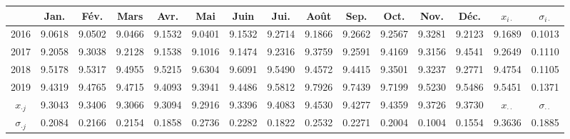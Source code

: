 \begin{tabular}{ccccccccccccccc}
    \toprule
        & Jan. & Fév. & Mars & Avr. & Mai & Juin & Jui. & Août & Sep. & Oct. & Nov. & Déc. & $x_{i\cdot}$ & $\sigma_{i\cdot}$ \\
    \midrule
        2016 & 9.0618 & 9.0502 & 9.0466 & 9.1532 & 9.0401 & 9.1532 & 9.2714 & 9.1866 & 9.2662 & 9.2567 & 9.3281 & 9.2123 & 9.1689 & 0.1013 \\ 
        2017 & 9.2058 & 9.3038 & 9.2128 & 9.1538 & 9.1016 & 9.1474 & 9.2316 & 9.3759 & 9.2591 & 9.4169 & 9.3156 & 9.4541 & 9.2649 & 0.1110 \\ 
        2018 & 9.5178 & 9.5317 & 9.4955 & 9.5215 & 9.6304 & 9.6091 & 9.5490 & 9.4572 & 9.4415 & 9.3501 & 9.3237 & 9.2771 & 9.4754 & 0.1105 \\ 
        2019 & 9.4319 & 9.4765 & 9.4715 & 9.4093 & 9.3941 & 9.4486 & 9.5812 & 9.7926 & 9.7439 & 9.7199 & 9.5230 & 9.5486 & 9.5451 & 0.1371 \\ 
    \midrule
        $x_{\cdot j}$ &9.3043 & 9.3406 & 9.3066 & 9.3094 & 9.2916 & 9.3396 & 9.4083 & 9.4530 & 9.4277 & 9.4359 & 9.3726 & 9.3730 & $x_{\cdot\cdot}$ & $\sigma_{\cdot\cdot}$ \\ 
        $\sigma_{\cdot j}$ & 0.2084 & 0.2166 & 0.2154 & 0.1858 & 0.2736 & 0.2282 & 0.1822 & 0.2532 & 0.2271 & 0.2004 & 0.1004 & 0.1554 & 9.3636 & 0.1885 \\ 
    \bottomrule
\end{tabular}